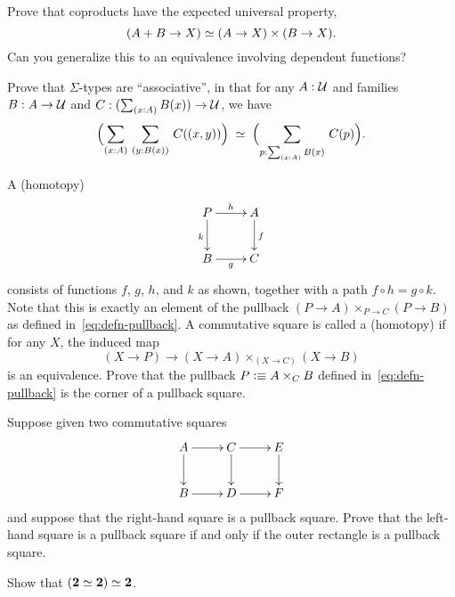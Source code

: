 \begin{ex}\label{ex:coprod-ump}
%
Prove that coproducts have the expected universal property,
\[ (A+B \to X) \simeq (A\to X)\times (B\to X). \]
Can you generalize this to an equivalence involving dependent functions?
\end{ex}

\begin{ex}\label{ex:sigma-assoc}
Prove that $\Sigma$-types are ``associative'',
%
in that for any $A:\mathcal{U}$ and families $B:A\to\mathcal{U}$ and $C:(\sm{x:A} B(x))\to\UU$, we have
\[\eqvspaced{\Parens{\sm{x:A}{y:B(x)} C(\pairr{x,y})}}{\Parens{\sm{p:\sm{x:A}B(x)} C(p)}}. \]
\end{ex}

\begin{ex}\label{ex:pullback}
A (homotopy) 
%
\begin{equation*}
    \vcenter{\xymatrix{
        P\ar[r]^h\ar[d]_k &
        A\ar[d]^f\\
        B\ar[r]_g &
        C
    }}
\end{equation*}
consists of functions $f$, $g$, $h$, and $k$ as shown, together with a path $f \circ h= g \circ k$.
Note that this is exactly an element of the pullback $(P\to A) \times_{P\to C} (P\to B)$ as defined in~\eqref{eq:defn-pullback}.
A commutative square is called a (homotopy) 
%
if for any $X$, the induced map
\[ (X\to P) \to (X\to A) \times_{(X\to C)} (X\to B) \]
is an equivalence.
Prove that the pullback $P \vcentcolon\equiv A\times_C B$ defined in~\eqref{eq:defn-pullback} is the corner of a pullback square.
\end{ex}

\begin{ex}\label{ex:pullback-pasting}
Suppose given two commutative squares
\begin{equation*}
    \vcenter{\xymatrix{
        A\ar[r]\ar[d] &
        C\ar[r]\ar[d] &
        E\ar[d]\\
        B\ar[r] &
        D\ar[r] &
        F
    }}
\end{equation*}
and suppose that the right-hand square is a pullback square.
Prove that the left-hand square is a pullback square if and only if the outer rectangle is a pullback square.
\end{ex}

\begin{ex}\label{ex:eqvboolbool}
Show that $(\mathbf{2} \simeq \mathbf{2}) \simeq \mathbf{2}$.
\end{ex}

